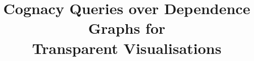 \documentclass{llncs}
\begin{document}
\title{Cognacy Queries over Dependence Graphs for \\Transparent Visualisations}


\maketitle









\printbibliography

\clearpage
\appendix


\end{document}
